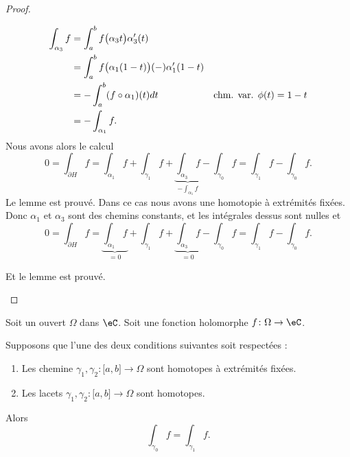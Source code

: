 \begin{proof}
\begin{subproof}
\begin{subproof}
\begin{subequations}
            \begin{align}
                \int_{\alpha_3}f&=\int_a^bf\big( \alpha_3t \big)\alpha_3'(t)\\
                &=\int_a^bf\big( \alpha_1(1-t) \big)(-)\alpha_1'(1-t)\\
                &=-\int_a^b(f\circ\alpha_1)(t)dt        &\text{chm. var. \( \phi(t)=1-t\)}\\
                &=-\int_{\alpha_1}f.
            \end{align}
        \end{subequations}
        Nous avons alors le calcul
        \begin{equation}
            0=\int_{\partial H}f=\int_{\alpha_1}f+\int_{\gamma_1}f+\underbrace{\int_{\alpha_3}f}_{-\int_{\alpha_1}f}-\int_{\gamma_0}f=\int_{\gamma_1}f-\int_{\gamma_0}f.
        \end{equation}
        Le lemme est prouvé.
    Dans ce cas nous avons une homotopie à extrémités fixées. Donc \( \alpha_1\) et \( \alpha_3\) sont des chemins constants, et les intégrales dessus sont nulles et
        \begin{equation}
            0=\int_{\partial H}f=\underbrace{\int_{\alpha_1}f}_{=0}+\int_{\gamma_1}f+\underbrace{\int_{\alpha_3}f}_{=0}-\int_{\gamma_0}f=\int_{\gamma_1}f-\int_{\gamma_0}f.
        \end{equation}
    \end{subproof}
    Et le lemme est prouvé.
    \end{subproof}
\end{proof}


\begin{theorem}     \label{THOooVTFXooBgvVyD}
    Soit un ouvert \( \Omega\) dans \( \eC\). Soit une fonction holomorphe \( f\colon \Omega\to \eC\). 

    Supposons que l'une des deux conditions suivantes soit respectées :
    \begin{enumerate}
        \item
        Les chemine \( \gamma_1,\gamma_2\colon \mathopen[ a , b \mathclose]\to \Omega \) sont homotopes à extrémités fixées. 
    \item       \label{ITEMooESDVooFgVarr}
        Les lacets \( \gamma_1,\gamma_2\colon \mathopen[ a , b \mathclose]\to \Omega \) sont homotopes.
    \end{enumerate}
    Alors
    \begin{equation}
        \int_{\gamma_0}f=\int_{\gamma_1}f.
    \end{equation}
\end{theorem}

